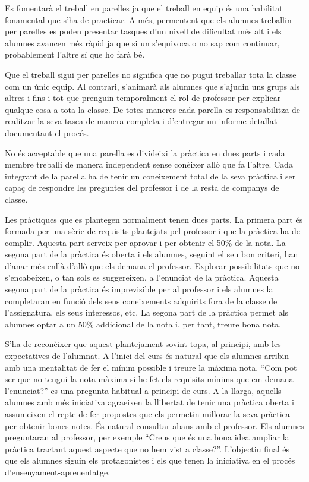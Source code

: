 \documentclass[catalan, a4paper, 12pt, titlepage]{article}
\begin{document}
Es fomentarà el treball en parelles ja que el treball en equip és una habilitat fonamental que s'ha de practicar.
A més, permentent que els alumnes treballin per parelles es poden presentar tasques d'un nivell de dificultat més alt i els alumnes avancen més ràpid ja que si un s'equivoca o no sap com continuar, probablement l'altre sí que ho farà bé.

Que el treball sigui per parelles no significa que no pugui treballar tota la classe com un únic equip.
Al contrari, s'animarà als alumnes que s'ajudin uns grups als altres i fins i tot que prenguin temporalment el rol de professor per explicar qualque cosa a tota la classe.
De totes maneres cada parella es responsabilitza de realitzar la seva tasca de manera completa i d'entregar un informe detallat documentant el procés.

No és acceptable que una parella es divideixi la pràctica en dues parts i cada membre treballi de manera independent sense conèixer allò que fa l'altre. 
Cada integrant de la parella ha de tenir un coneixement total de la seva pràctica i ser capaç de respondre les preguntes del professor i de la resta de companys de classe.

Les pràctiques que es plantegen normalment tenen dues parts.
La primera part és formada per una sèrie de requisits plantejats pel professor i que la pràctica ha de complir. 
Aquesta part serveix per aprovar i per obtenir el 50\% de la nota.
La segona part de la pràctica és oberta i els alumnes, seguint el seu bon criteri, han d'anar més enllà d'allò que els demana el professor.
Explorar possibilitats que no s'encabeixen, o tan sols es suggereixen, a l'enunciat de la pràctica.
Aquesta segona part de la pràctica és imprevisible per al professor i els alumnes la completaran en funció dels seus coneixements adquirits fora de la classe de l'assignatura, els seus interessos, etc.
La segona part de la pràctica permet als alumnes optar a un 50\% addicional de la nota i, per tant, treure bona nota.

S'ha de reconèixer que aquest plantejament sovint topa, al principi, amb les expectatives de l'alumnat.
A l'inici del curs és natural que els alumnes arribin amb una mentalitat de fer el mínim possible i treure la màxima nota.
``Com pot ser que no tengui la nota màxima si he fet els requisits mínims que em demana l'enunciat?'' es una pregunta habitual a principi de curs.
A la llarga, aquells alumnes amb més iniciativa agraeixen la llibertat de tenir una pràctica oberta i assumeixen el repte de fer propostes que els permetin millorar la seva pràctica per obtenir bones notes.
És natural consultar abans amb el professor. 
Els alumnes preguntaran al professor, per exemple ``Creus que és una bona idea ampliar la pràctica tractant aquest aspecte que no hem vist a classe?''.
L'objectiu final és que els alumnes siguin els protagonistes i els que tenen la iniciativa en el procés d'ensenyament-aprenentatge.
\end{document}
